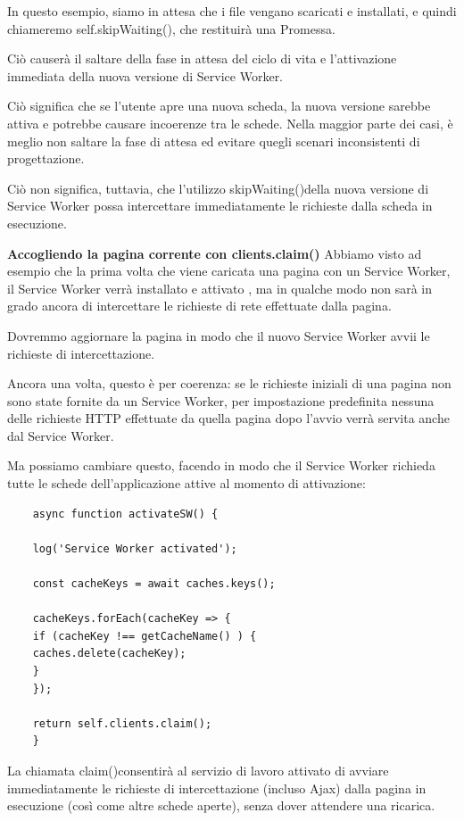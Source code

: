 \documentclass[italian]{article}
\begin{document}
In questo esempio, siamo in attesa che i file vengano scaricati e installati, e quindi chiameremo self.skipWaiting(), che restituirà una Promessa.

Ciò causerà il saltare della fase in attesa del ciclo di vita e l'attivazione immediata della nuova versione di Service Worker.

Ciò significa che se l'utente apre una nuova scheda, la nuova versione sarebbe attiva e potrebbe causare incoerenze tra le schede. Nella maggior parte dei casi, è meglio non saltare la fase di attesa ed evitare quegli scenari inconsistenti di progettazione.

Ciò non significa, tuttavia, che l'utilizzo skipWaiting()della nuova versione di Service Worker possa intercettare immediatamente le richieste dalla scheda in esecuzione.

\textbf{Accogliendo la pagina corrente con clients.claim()}
Abbiamo visto ad esempio che la prima volta che viene caricata una pagina con un Service Worker, il Service Worker verrà installato e attivato , ma in qualche modo non sarà in grado ancora di intercettare le richieste di rete effettuate dalla pagina.

Dovremmo aggiornare la pagina in modo che il nuovo Service Worker avvii le richieste di intercettazione.

Ancora una volta, questo è per coerenza: se le richieste iniziali di una pagina non sono state fornite da un Service Worker, per impostazione predefinita nessuna delle richieste HTTP effettuate da quella pagina dopo l'avvio verrà servita anche dal Service Worker.

Ma possiamo cambiare questo, facendo in modo che il Service Worker richieda tutte le schede dell'applicazione attive al momento di attivazione:
\begin{lstlisting}
	async function activateSW() {
	
	log('Service Worker activated');
	
	const cacheKeys = await caches.keys();
	
	cacheKeys.forEach(cacheKey => {
	if (cacheKey !== getCacheName() ) {
	caches.delete(cacheKey);
	}
	});
	
	return self.clients.claim();
	}
\end{lstlisting}
La chiamata claim()consentirà al servizio di lavoro attivato di avviare immediatamente le richieste di intercettazione (incluso Ajax) dalla pagina in esecuzione (così come altre schede aperte), senza dover attendere una ricarica.
\end{document}
